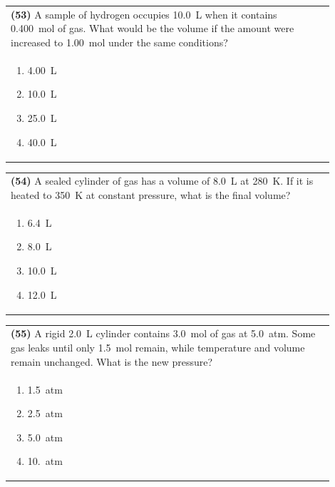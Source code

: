 \documentclass{article}
\begin{document}
{{\vspace{0.2cm}
\noindent\begin{tabular}{|p{0.9\linewidth}|}
\hline
\textbf{(53)} A sample of hydrogen occupies 10.0~L when it contains 0.400~mol of gas. What would be the volume if the amount were increased to 1.00~mol under the same conditions?\\[0.2cm]
\begin{minipage}[t]{0.85\linewidth}
\begin{enumerate}[label=\alph*.]
\item 4.00~L
\item 10.0~L
\item 25.0~L
\item 40.0~L
\end{enumerate}
\end{minipage}\\[0.2cm]
\hline
\end{tabular}

\vspace{0.2cm}
\noindent\begin{tabular}{|p{0.9\linewidth}|}
\hline
\textbf{(54)} A sealed cylinder of gas has a volume of 8.0~L at 280~K. If it is heated to 350~K at constant pressure, what is the final volume?\\[0.2cm]
\begin{minipage}[t]{0.85\linewidth}
\begin{enumerate}[label=\alph*.]
\item 6.4~L
\item 8.0~L
\item 10.0~L
\item 12.0~L
\end{enumerate}
\end{minipage}\\[0.2cm]
\hline
\end{tabular}

\vspace{0.2cm}
\noindent\begin{tabular}{|p{0.9\linewidth}|}
\hline
\textbf{(55)} A rigid 2.0~L cylinder contains 3.0~mol of gas at 5.0~atm. Some gas leaks until only 1.5~mol remain, while temperature and volume remain unchanged. What is the new pressure?\\[0.2cm]
\begin{minipage}[t]{0.85\linewidth}
\begin{enumerate}[label=\alph*.]
\item 1.5~atm
\item 2.5~atm
\item 5.0~atm
\item 10.~atm
\end{enumerate}
\end{minipage}\\[0.2cm]
\hline
\end{tabular}

}}
\end{document}
